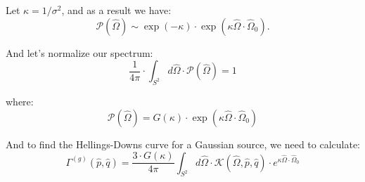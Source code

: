 Let $\kappa = 1/\sigma^2$, and as a result we have:
\begin{equation}
\mathcal{P}(\hat{\Omega}) \sim \exp \left(-\kappa \right) \cdot  \exp \left( \kappa \hat{\Omega} \cdot \hat{\Omega}_0 \right).
\end{equation}

And let's normalize our spectrum:
\begin{equation}
\frac{1}{4 \pi} \cdot \int_{S^2} d \hat{\Omega} \cdot \mathcal{P}(\hat{\Omega}) = 1
\end{equation}

where:
\begin{equation}
\mathcal{P}(\hat{\Omega}) = G (\kappa) \cdot  \exp \left( \kappa \hat{\Omega} \cdot \hat{\Omega}_0 \right)
\end{equation}


And to find the Hellings-Downs curve for a Gaussian source, we need to calculate:
\begin{equation}
\Gamma^{(g)}(\hat{p}, \hat{q}) = \frac{3 \cdot G (\kappa)}{4\pi}\int_{S^2} d \hat{\Omega} \cdot \mathcal{K}(\hat{\Omega}, \hat{p}, \hat{q}) \cdot e^{\kappa \hat{\Omega} \cdot \hat{\Omega}_0}
\end{equation}